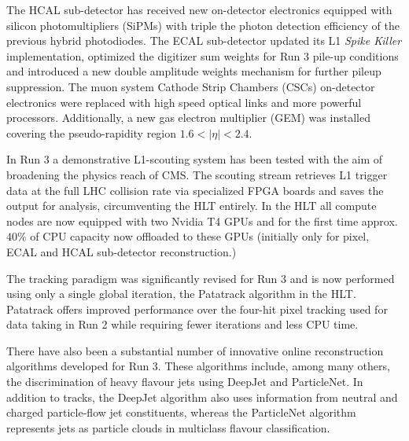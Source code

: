 The HCAL sub-detector has received new on-detector electronics equipped with silicon photomultipliers (SiPMs) with triple the photon detection efficiency\cite{strobbe2017upgradecms} of the previous hybrid photodiodes. The ECAL sub-detector updated its L1 \textit{Spike Killer}\cite{daci2011cms} implementation, optimized the digitizer sum weights for Run 3 pile-up conditions and introduced a new double amplitude weights mechanism for further pileup suppression\cite{tishelman2022ecalcms}. The muon system Cathode Strip Chambers (CSCs) on-detector electronics were replaced with high speed optical links and more powerful processors. Additionally, a new gas electron multiplier (GEM) was installed covering the pseudo-rapidity region $1.6<|\eta|<2.4$\cite{battilana2019sissacms,colaleo2015cms}.
\vspace{12pt}

In Run 3 a demonstrative L1-scouting system has been tested\cite{morovic2023cms,ardino202340cms} with the aim of broadening the physics reach of CMS. The scouting stream retrieves L1 trigger data at the full LHC collision rate via specialized FPGA boards and saves the output for analysis, circumventing the HLT entirely. In the HLT all compute nodes are now equipped with two Nvidia T4 GPUs\cite{bocci2023cms} and for the first time approx. $40\%$ of CPU capacity now offloaded to these GPUs (initially only for pixel, ECAL and HCAL sub-detector reconstruction\cite{andre2019cms}.)
\vspace{12pt}

The tracking paradigm was significantly revised for Run 3 and is now performed using only a single global iteration, the Patatrack algorithm\cite{bocci2020heterogeneouscms,cms2018patatrack} in the HLT. Patatrack offers improved performance over the four-hit pixel tracking used for data taking in Run 2 while requiring fewer iterations and less CPU time. 
\vspace{12pt}

There have also been a substantial number of innovative online reconstruction algorithms developed for Run 3. These algorithms include, among many others, the discrimination of heavy flavour jets using DeepJet\cite{bols2020jetcms} and ParticleNet\cite{qu1902particlenetcms}. In addition to tracks, the DeepJet algorithm also
uses information from neutral and charged particle-flow jet constituents, whereas the ParticleNet algorithm represents jets as particle clouds in multiclass flavour classification. 
\par

